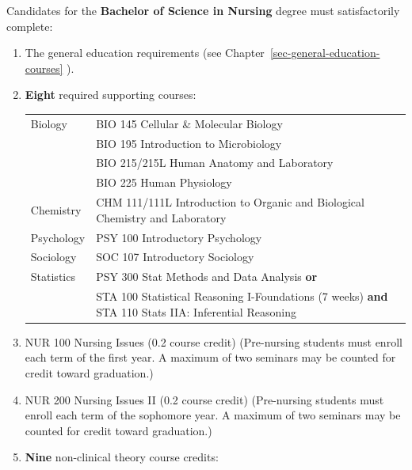 \documentclass[
  letterpaper,
]{scrbook}
\renewcommand\toprule[2]\relax
\renewcommand\bottomrule[2]\relax
\begin{document}
Candidates for the \textbf{Bachelor of Science in Nursing} degree must
satisfactorily complete:

\begin{enumerate}
\def\labelenumi{\arabic{enumi}.}
\item
  The general education requirements (see
  Chapter~\ref{sec-general-education-courses} ).
\item
  \textbf{Eight} required supporting courses:

  \begin{longtable}[]{@{}
    >{\raggedright\arraybackslash}p{}
    >{\raggedleft\arraybackslash}p{}@{}}
  \toprule\noalign{}
  \endhead
  \bottomrule\noalign{}
  \endlastfoot
  Biology & BIO 145 Cellular \& Molecular Biology \\
  ~ & BIO 195 Introduction to Microbiology \\
  ~ & BIO 215/215L Human Anatomy and Laboratory \\
  ~ & BIO 225 Human Physiology \\
  Chemistry & CHM 111/111L Introduction to Organic and Biological
  Chemistry and Laboratory \\
  Psychology & PSY 100 Introductory Psychology \\
  Sociology & SOC 107 Introductory Sociology \\
  Statistics & PSY 300 Stat Methods and Data Analysis \textbf{or} \\
  ~ & STA 100 Statistical Reasoning I-Foundations (7 weeks) \textbf{and}
  STA 110 Stats IIA: Inferential Reasoning \\
  \end{longtable}
\item
  NUR 100 Nursing Issues (0.2 course credit) (Pre-nursing students must
  enroll each term of the first year. A maximum of two seminars may be
  counted for credit toward graduation.)
\item
  NUR 200 Nursing Issues II (0.2 course credit) (Pre-nursing students
  must enroll each term of the sophomore year. A maximum of two seminars
  may be counted for credit toward graduation.)
\item
  \textbf{Nine} non-clinical theory course credits:


\end{enumerate}
\end{document}
